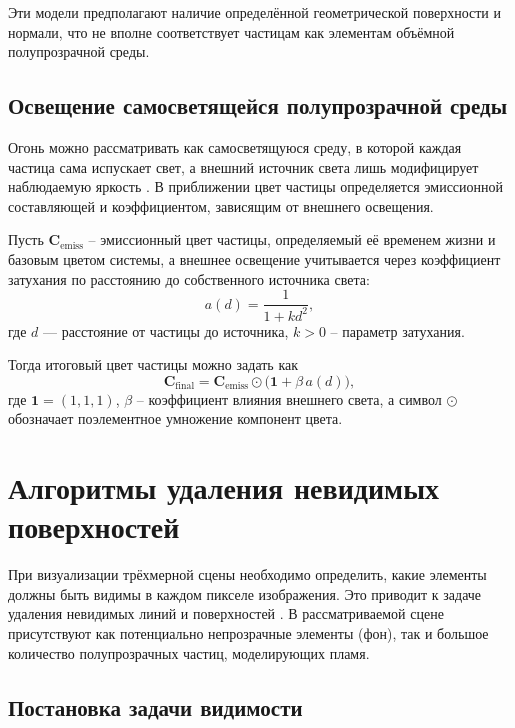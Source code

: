 Эти модели предполагают наличие определённой геометрической поверхности и нормали, что не вполне соответствует частицам как элементам объёмной полупрозрачной среды.

\subsection{Освещение самосветящейся полупрозрачной среды}

Огонь можно рассматривать как самосветящуюся среду, в которой каждая частица сама испускает свет, а внешний источник света лишь модифицирует наблюдаемую яркость \cite{VolumeRendering}. В приближении цвет частицы определяется эмиссионной составляющей и коэффициентом, зависящим от внешнего освещения.

Пусть $\mathbf{C}_{\text{emiss}}$ -- эмиссионный цвет частицы, определяемый её временем жизни и базовым цветом системы, а внешнее освещение учитывается через коэффициент затухания по расстоянию до собственного источника света:
\begin{equation}
	a(d) = \frac{1}{1 + k d^{2}},
\end{equation}
где $d$ --- расстояние от частицы до источника, $k > 0$ -- параметр затухания.\cite{FoleyVanDam}

Тогда итоговый цвет частицы можно задать как
\begin{equation}
	\mathbf{C}_{\text{final}} =
	\mathbf{C}_{\text{emiss}} \odot \bigl( \mathbf{1} + \beta\, a(d) \bigr),
\end{equation}
где $\mathbf{1} = (1, 1, 1)$, $\beta$ -- коэффициент влияния внешнего света, а символ $\odot$ обозначает поэлементное умножение компонент цвета.\cite{EckCG}

\section{Алгоритмы удаления невидимых поверхностей}

При визуализации трёхмерной сцены необходимо определить, какие элементы должны быть видимы в каждом пикселе изображения. Это приводит к задаче удаления невидимых линий и поверхностей \cite{DemCG}. В рассматриваемой сцене присутствуют как потенциально непрозрачные элементы (фон), так и большое количество полупрозрачных частиц, моделирующих пламя.

\subsection{Постановка задачи видимости}


